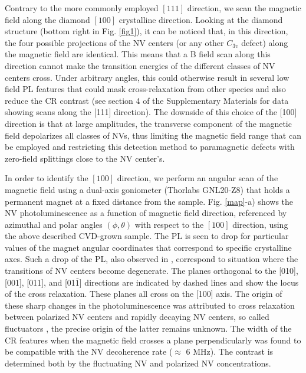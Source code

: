 \documentclass[9pt,twocolumn,twoside]{revtex4-1}
\begin{document}
Contrary to the more commonly employed $[ 111 ]$ direction, we scan the magnetic field along the diamond $[100]$ crystalline direction. 
Looking at the diamond structure (bottom right in Fig.  \ref{fig1}), it can be noticed that, in this direction, the four possible projections of the NV centers (or any other $C_{3v}$ defect) along the magnetic field are identical. This means that a B field scan along this direction cannot make the transition energies of the different classes of NV centers cross. Under arbitrary angles, this could otherwise result in several low field PL features \cite{van_oort_optically_1991, akhmedzhanov_magnetometry_2019} that could mask cross-relaxation from other species and also reduce the CR contrast (see section 4 of the Supplementary Materials for data showing scans along the [111] direction). 
The downside of this choice of the [100] direction is that at large amplitudes, the transverse component of the magnetic field depolarizes all classes of NVs, thus limiting the magnetic field range that can be employed and restricting this detection method to paramagnetic defects with zero-field splittings close to the NV center's.

In order to identify the $[100]$ direction, we perform an angular scan of the magnetic field using a dual-axis goniometer (Thorlabs GNL20-Z8) that holds a permanent magnet at a fixed distance from the sample. 
Fig. \ref{map}-a) shows the NV photoluminescence as a function of magnetic field direction, referenced by azimuthal and polar angles $(\phi, \theta)$ with respect to the $[100]$ direction, using the above described CVD-grown sample. The PL is seen to drop for particular values of the magnet angular coordinates that correspond to specific crystalline axes.
Such a drop of the PL, also observed in
\cite{van_oort_optically_1991, van_oort_cross-relaxation_1989, jarmola_longitudinal_2015, akhmedzhanov_microwave-free_2017, akhmedzhanov_magnetometry_2019, holliday_optical_1989, choi_depolarization_2017}, correspond to situation where the transitions of NV centers become degenerate. 
The planes orthogonal to the [010], [001], [011], and [01$\bar 1$] directions are indicated by dashed lines and show the locus of the cross relaxation. These planes all cross on the [100] axis.
The origin of these sharp changes in the photoluminescence was attributed to cross relaxation between polarized NV centers and rapidly decaying NV centers, so called fluctuators \cite{choi_depolarization_2017}, the precise origin of the latter remains unknown.
The width of the CR features when the magnetic field crosses a plane perpendicularly was found to be compatible with the NV decoherence rate  ($\approx$ 6 MHz). The contrast is determined both by the fluctuating NV and polarized NV concentrations.
\end{document}
